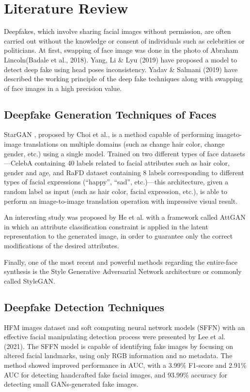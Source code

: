 \chapter{Literature Review}
Deepfakes, which involve sharing facial images without permission, are often carried out without the knowledge or consent of individuals such as celebrities or politicians. At first, swapping of face image was done in the photo of Abraham Lincoln(Badale et al., 2018)\cite{badale2018deep}. Yang, Li \& Lyu (2019)\cite{yang2019exposing} have proposed a model to detect deep fake using head poses inconsistency. Yadav \& Salmani (2019)\cite{yadav2019deepfake} have described the working principle of the deep fake techniques along with swapping of face images in a high precision value.

\section{Deepfake Generation Techniques of Faces}
StarGAN \cite{choi2018stargan}, proposed by Choi et al., is a method capable of performing imageto-image translations on multiple domains (such as change hair color, change gender,
etc.) using a single model. Trained on two different types of face datasets—CelebA \cite{7410782}
containing 40 labels related to facial attributes such as hair color, gender and age, and
RaFD dataset \cite{cho2019imagetoimage} containing 8 labels corresponding to different types of facial expressions
(“happy”, “sad”, etc.)—this architecture, given a random label as input (such as hair color, facial expression, etc.), is able to perform an image-to-image translation operation with impressive visual result. 

An interesting study was proposed by He et al. \cite{7410782} with a framework called
AttGAN in which an attribute classification constraint is applied in the latent representation to the generated image, in order to guarantee only the correct modifications of the
desired attributes. 

Finally, one of the most recent and powerful methods regarding the entire-face synthesis is the Style Generative Adversarial Network architecture or commonly called
StyleGAN. \cite{Giudice_2021}

\section{Deepfake Detection Techniques}
HFM images dataset and soft computing neural network models (SFFN) with an effective facial manipulating detection process were presented by Lee et al. (2021)\cite{lee2021detecting}. The SFFN model is capable of identifying fake images by focusing on altered facial landmarks, using only RGB information and no metadata. The method showed improved performance in AUC, with a 3.99\% F1-score and 2.91\% AUC for detecting handcrafted fake facial images, and 93.99\% accuracy for detecting small GANs-generated fake images.

